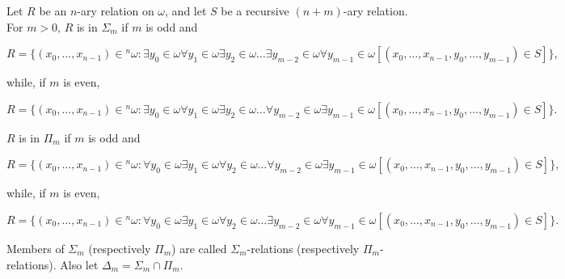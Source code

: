 Let $R$ be an $n$-ary relation on $\omega$, and let $S$ be a recursive $(n+m)$-ary relation. For $m > 0$, $R$ is in $\Sigma_m$ if $m$ is odd and

$$R = \{(x_0, \ldots, x_{n-1}) \in {}^n\omega : \exists y_0 \in \omega \forall y_1 \in \omega \exists y_2 \in \omega \ldots \exists y_{m-2} \in \omega \forall y_{m-1} \in \omega [(x_0, \ldots, x_{n-1}, y_0, \ldots, y_{m-1}) \in S]\},$$

while, if $m$ is even,

$$R = \{(x_0, \ldots, x_{n-1}) \in {}^n\omega : \exists y_0 \in \omega \forall y_1 \in \omega \exists y_2 \in \omega \ldots \forall y_{m-2} \in \omega \exists y_{m-1} \in \omega [(x_0, \ldots, x_{n-1}, y_0, \ldots, y_{m-1}) \in S]\}.$$

$R$ is in $\Pi_m$ if $m$ is odd and

$$R = \{(x_0, \ldots, x_{n-1}) \in {}^n\omega : \forall y_0 \in \omega \exists y_1 \in \omega \forall y_2 \in \omega \ldots \forall y_{m-2} \in \omega \exists y_{m-1} \in \omega [(x_0, \ldots, x_{n-1}, y_0, \ldots, y_{m-1}) \in S]\},$$

while, if $m$ is even,

$$R = \{(x_0, \ldots, x_{n-1}) \in {}^n\omega : \forall y_0 \in \omega \exists y_1 \in \omega \forall y_2 \in \omega \ldots \exists y_{m-2} \in \omega \forall y_{m-1} \in \omega [(x_0, \ldots, x_{n-1}, y_0, \ldots, y_{m-1}) \in S]\}.$$

Members of $\Sigma_m$ (respectively $\Pi_m$) are called $\Sigma_m$-relations (respectively $\Pi_m$-relations). Also let $\Delta_m = \Sigma_m \cap \Pi_m$.
